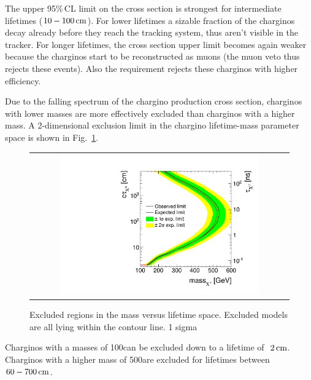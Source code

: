 The upper 95\%\,CL limit on the cross section is strongest for intermediate lifetimes ($10-100\,\text{cm}$).
For lower lifetimes a sizable fraction of the charginos decay already before they reach the tracking system, thus aren't visible in the tracker.
For longer lifetimes, the cross section upper limit becomes again weaker because the charginos start to be reconstructed as muons (the muon veto thus rejects these events).
Also the \ecalo requirement rejects these charginos with higher efficiency.

Due to the falling spectrum of the chargino production cross section, charginos with lower masses are more effectively excluded than charginos with a higher mass.
A 2-dimensional exclusion limit in the chargino lifetime-mass parameter space is shown in Fig.~\ref{fig:2dLimit}.
\begin{figure}[!t]
  \centering 
  \begin{tabular}{c}
    \includegraphics[width=0.79\textwidth]{figures/analysis/Interpretation/ExclusionLimits/LimitPlot_2d_log_cm.pdf} 
  \end{tabular}
  \caption{Excluded regions in the mass versus lifetime space.
           Excluded models are all lying within the contour line.
          1 sigma}
  \label{fig:2dLimit}
\end{figure} 

Charginos with a masses of 100\gev can be excluded down to a lifetime of $~2\,\text{cm}$.
Charginos with a higher mass of 500\gev are excluded for lifetimes between $60-700\,\text{cm}$.

